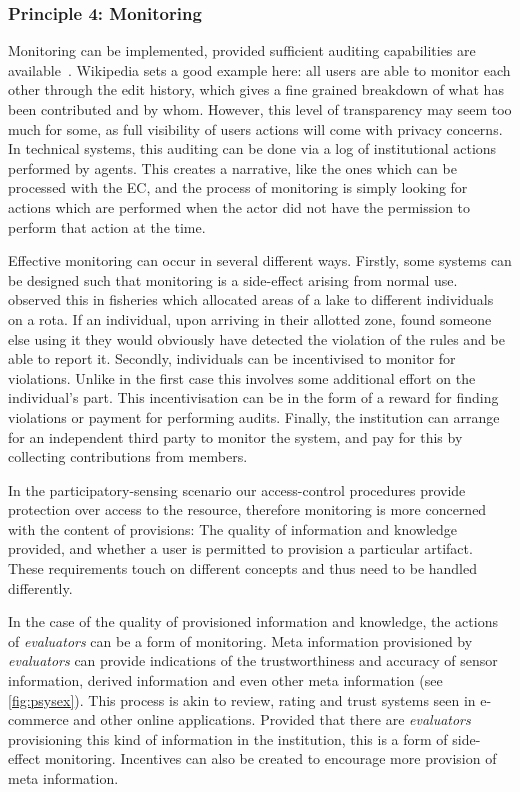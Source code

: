 \subsubsection*{Principle 4: Monitoring}

Monitoring can be implemented, provided sufficient auditing capabilities are available~\citep{Pitt2012b}. Wikipedia sets a good example here: all users are able to monitor each other through the edit history, which gives a fine grained breakdown of what has been contributed and by whom. However, this level of transparency may seem too much for some, as full visibility of users actions will come with privacy concerns. 
In technical systems, this auditing can be done via a log of institutional actions performed by agents. This creates a narrative, like the ones which can be processed with the \ac{EC}, and the process of monitoring is simply looking for actions which are performed when the actor did not have the permission to perform that action at the time.

Effective monitoring can occur in several different ways. 
Firstly, some systems can be designed such that monitoring is a side-effect arising from normal use. 
 observed this in fisheries which allocated areas of a lake to different individuals on a rota. 
If an individual, upon arriving in their allotted zone, found someone else using it they would obviously have detected the violation of the rules and be able to report it. 
Secondly, individuals can be incentivised to monitor for violations. Unlike in the first case this involves some additional effort on the individual's part. 
This incentivisation can be in the form of a reward for finding violations or payment for performing audits. 
Finally, the institution can arrange for an independent third party to monitor the system, and pay for this by collecting contributions from members.

In the participatory-sensing scenario our access-control procedures provide protection over access to the resource, therefore monitoring is more concerned with the content of provisions: The quality of information and knowledge provided, and whether a user is permitted to provision a particular artifact. 
These requirements touch on different concepts and thus need to be handled differently. 

In the case of the quality of provisioned information and knowledge, the actions of \emph{evaluators} can be a form of monitoring. 
Meta information provisioned by \emph{evaluators} can provide indications of the trustworthiness and accuracy of sensor information, derived information and even other meta information (see \autoref{fig:psysex}). 
This process is akin to review, rating and trust systems seen in e-commerce and other online applications. Provided that there are \emph{evaluators} provisioning this kind of information in the institution, this is a form of side-effect monitoring. 
Incentives can also be created to encourage more provision of meta information.

